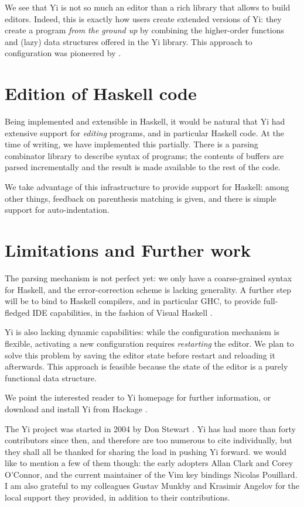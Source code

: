 \documentclass[9pt,indentedstyle,preprint]{sigplanconf}
\begin{document}
We see that Yi is not so much an editor than a rich library that
allows to build editors. Indeed, this is exactly how users create
extended versions of Yi: they create a program {\em from the ground
  up} by combining the higher-order functions and (lazy) data
structures offered in the Yi library. This approach to
configuration was pioneered by \citet{Stewart2007XMonad}.

\section{Edition of Haskell code}

Being implemented and extensible in Haskell, it would be natural that
Yi had extensive support for \emph{editing} programs, and in
particular Haskell code.  At the time of writing, we have implemented
this partially. There is a parsing combinator library to describe
syntax of programs; the contents of buffers are parsed incrementally
and the result is made available to the rest of the code.

We take advantage of this infrastructure to provide support for
Haskell: among other things, feedback on parenthesis matching is
given, and there is simple support for auto-indentation.

\section{Limitations and Further work}

The parsing mechanism is not perfect yet: we only have a coarse-grained
syntax for Haskell, and the error-correction scheme is lacking
generality.  A further step will be to bind to Haskell compilers, and
in particular GHC, to provide full-fledged IDE capabilities, in the
fashion of Visual Haskell \cite{Angelov2005VH}.

Yi is also lacking dynamic capabilities: while the configuration
mechanism is flexible, activating a new configuration requires {\em
  restarting} the editor.  We plan to solve this problem by saving the
editor state before restart and reloading it afterwards. This approach is
feasible because the state of the editor is a purely functional data
structure.

We point the interested reader to Yi homepage \cite{YiHome} for
further information, or download and install Yi from Hackage
\cite{Hackage}.

\acks 

The Yi project was started in 2004 by Don Stewart
\cite{Stewart2005Dynamic}. Yi has had more than forty contributors
since then, and therefore are too numerous to cite individually, but
they shall all be thanked for sharing the load in pushing Yi
forward. we would like to mention a few of them though: the early adopters Allan Clark
and Corey O'Connor, and the current maintainer of the
Vim key bindings Nicolas Pouillard. I am also grateful to my colleagues Gustav Munkby and
Krasimir Angelov for the local support they provided, in addition to
their contributions.
\end{document}
